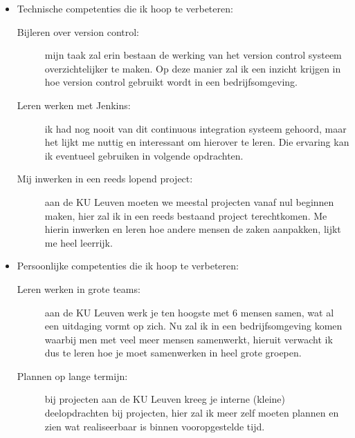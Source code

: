 \documentclass[10pt,a4paper]{article}
\begin{document}
\begin{appendices}
\begin{itemize}
\item Technische competenties die ik hoop te verbeteren:
\begin{description}
\item[Bijleren over version control:] mijn taak zal erin bestaan de werking van het version control systeem overzichtelijker te maken. Op deze manier zal ik een inzicht krijgen in hoe version control gebruikt wordt in een bedrijfsomgeving.
\item[Leren werken met Jenkins:] ik had nog nooit van dit continuous integration systeem gehoord, maar het lijkt me nuttig en interessant om hierover te leren. Die ervaring kan ik eventueel gebruiken in volgende opdrachten.
\item[Mij inwerken in een reeds lopend project:] aan de KU Leuven moeten we meestal projecten vanaf nul beginnen maken, hier zal ik in een reeds bestaand project terechtkomen. Me hierin inwerken en leren hoe andere mensen de zaken aanpakken, lijkt me heel leerrijk.
\end{description}
\item Persoonlijke competenties die ik hoop te verbeteren:
\begin{description}
\item[Leren werken in grote teams:] aan de KU Leuven werk je ten hoogste met 6 mensen samen, wat al een uitdaging vormt op zich. Nu zal ik in een bedrijfsomgeving komen waarbij men met veel meer mensen samenwerkt, hieruit verwacht ik dus te leren hoe je moet samenwerken in heel grote groepen.
\item[Plannen op lange termijn:] bij projecten aan de KU Leuven kreeg je interne (kleine) deelopdrachten bij projecten, hier zal ik meer zelf moeten plannen en zien wat realiseerbaar is binnen vooropgestelde tijd.
\end{description}
\end{itemize}

\end{appendices}

\end{document}

